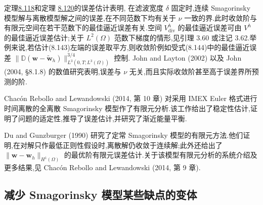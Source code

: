 \begin{note}[误差估计的解释与数值研究]
\label{note:smagorinsky-error-estimate-interpretation}
定理\hyperref[thm:smagorinsky-fem-error-estimate-standard]{8.118}和定理
\hyperref[thm:smagorinsky-error-estimate-uniform]{8.120}的误差估计表明,
在滤波宽度 $\delta$ 固定时,连续 Smagorinsky 模型解与离散模型解之间的误差,在不同范数下均有关于 $\nu$ 一致的界.此时收敛阶与有限元空间在若干范数下的最佳逼近误差有关.空间 $V_{\mathrm{div}}^h$ 的最佳逼近误差可由 $V^h$ 的最佳逼近误差估计;关于 $L^2(\Omega)$ 范数下梯度的情形,见引理 3.60 或注记 3.62.举例来说,若估计(8.143)左端的误差取平方,则收敛阶例如受式(8.144)中的最佳逼近误差
$\|\mathbb{D}(\bm{w}-\widetilde{\bm{w}}_h)\|_{L^3(0,T;L^3(\Omega))}^{3/4}$ 控制.
John and Layton (2002) 以及 John (2004, §8.1.8) 的数值研究表明,误差与 $\nu$ 无关,而且实际收敛阶甚至高于误差界所预测的阶.
\end{note}

\begin{note}
\label{note:smagorinsky-fully-discrete-analysis}
Chacón Rebollo and Lewandowski (2014, 第 10 章) 对采用 IMEX Euler 格式进行时间离散的全离散 Smagorinsky 模型作了有限元分析.该工作给出了稳定性估计,证明了问题的适定性,推导了误差估计,并研究了渐近能量平衡.
\end{note}

\begin{note}
\label{note:smagorinsky-stationary-analysis}
Du and Gunzburger (1990) 研究了定常 Smagorinsky 模型的有限元方法.他们证明,在对解只作最低正则性假设时,离散解仍收敛于连续解;此外还给出了 $\|\bm{w}-\bm{w}_h\|_{H^1(\Omega)}$ 的最优阶有限元误差估计.关于该模型有限元分析的系统介绍及更多结果,见 Chacón Rebollo and Lewandowski (2014, 第 9 章).
\end{note}

\subsection{减少 Smagorinsky 模型某些缺点的变体}
\label{subsec:smagorinsky-variants}\label{subsec:smagorinsky-practical-experience}

